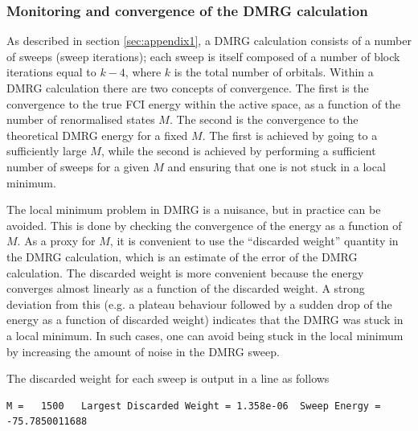 \documentclass[letterpaper,12pt,aps, pra]{revtex4-1}
\begin{document}
\subsubsection{Monitoring and convergence of the DMRG calculation}
\label{sec:dmrg_convergence}

As described in section \ref{sec:appendix1}, a DMRG calculation consists of a
number of sweeps (sweep iterations); each sweep is itself composed of a number
of block iterations equal to $k-4$, where $k$ is the total number of orbitals.
Within a DMRG calculation there are two concepts of convergence. The first is
the convergence to the true FCI energy within the active space, as a function
of the number of renormalised states $M$. The second is the convergence to the
theoretical DMRG energy for a fixed $M$. The first is achieved by going to a
sufficiently large $M$, while the second is achieved by performing a sufficient
number of sweeps for a given $M$ and ensuring that one is not stuck in a local
minimum.

The local minimum problem in DMRG is a nuisance, but in practice can be
avoided.  This is done by checking the convergence of the energy as a function
of $M$.  As a proxy for $M$, it is convenient to use the ``discarded weight''
quantity in the DMRG calculation, which is an estimate of the error of the DMRG
calculation. The discarded weight is more convenient because the energy
converges almost linearly as a function of the discarded weight. A strong
deviation from this (e.g. a plateau behaviour followed by a sudden drop of the
energy as a function of discarded weight) indicates that the DMRG was stuck in
a local minimum. In such cases, one can avoid being stuck in the local minimum
by increasing the amount of noise in the DMRG sweep.

The discarded weight for each sweep is output in a line as follows
\begin{verbatim}
M =   1500   Largest Discarded Weight = 1.358e-06  Sweep Energy =     -75.7850011688
\end{verbatim}
\end{document}

